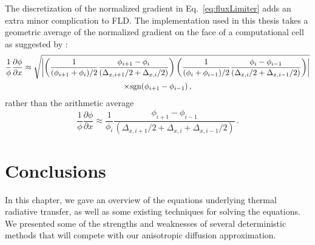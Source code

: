 The discretization of the normalized gradient in Eq.~\eqref{eq:fluxLimiter}
adds an extra minor complication to FLD. The implementation
used in this thesis takes a geometric average of the normalized gradient on the
face of a computational cell as suggested by \cite{Ols2007}:
\begin{multline*}
 \frac{1}{\phi} \frac{\partial \phi}{\partial x}
  \approx
\sqrt{\left|  \left(  \frac{1}{(\phi_{i+1} + \phi_{i})/2} \frac{\phi_{i+1} - \phi_{i}}
 { (\Delta_{x,i+1}/2 + \Delta_{x,i}/2)} \right)
\left(  \frac{1}{(\phi_{i} + \phi_{i-1})/2} \frac{\phi_{i} - \phi_{i-1}}
{ (\Delta_{x,i}/2 + \Delta_{x,i-1}/2)} \right)  \right|}
\\
\times
 \mathrm{sgn}(\phi_{i+1} - \phi_{i-1})\,,
\end{multline*}
rather than the arithmetic average
\begin{equation*}
 \frac{1}{\phi} \frac{\partial \phi}{\partial x}
  \approx
 \frac{1}{\phi_{i}} \frac{\phi_{i+1} - \phi_{i-1}}
 { (\Delta_{x,i+1}/2 + \Delta_{x,i} + \Delta_{x,i-1}/2)}\,.
\end{equation*}

\section{Conclusions}

In this chapter, we gave an overview of the equations underlying thermal
radiative transfer, as well as some existing techniques for solving the
equations. We presented some of the strengths and weaknesses of several
deterministic methods that will compete with our anisotropic diffusion
approximation.

